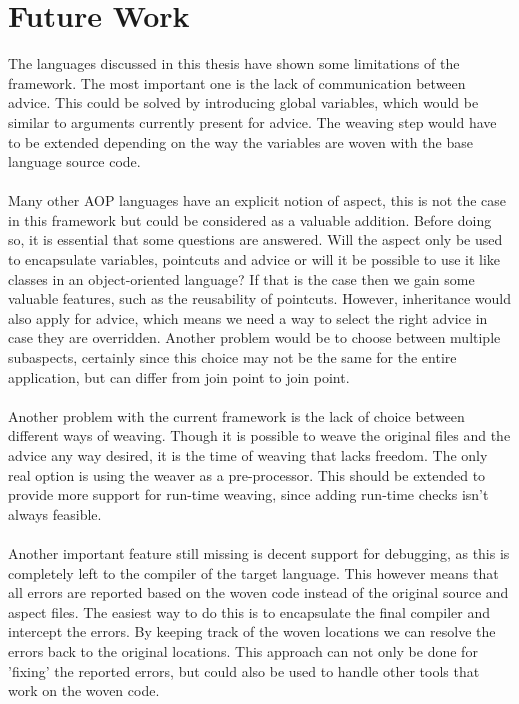 \documentclass[a4paper]{report}
\begin{document}
\chapter{Future Work}
\label{chap:FutureWork}
The languages discussed in this thesis have shown some limitations of the framework. The most important one is the lack of communication between advice. This could be solved by introducing global variables, which would be similar to arguments currently present for advice. The weaving step would have to be extended depending on the way the variables are woven with the base language source code.\\
\\
Many other AOP languages have an explicit notion of aspect, this is not the case in this framework but could be considered as a valuable addition. Before doing so, it is essential that some questions are answered. Will the aspect only be used to encapsulate variables, pointcuts and advice or will it be possible to use it like classes in an object-oriented language? If that is the case then we gain some valuable features, such as the reusability of pointcuts. However, inheritance would also apply for advice, which means we need a way to select the right advice in case they are overridden. Another problem would be to choose between multiple subaspects, certainly since this choice may not be the same for the entire application, but can differ from join point to join point.\\
\\
Another problem with the current framework is the lack of choice between different ways of weaving. Though it is possible to weave the original files and the advice any way desired, it is the time of weaving that lacks freedom. The only real option is using the weaver as a pre-processor. This should be extended to provide more support for run-time weaving, since adding run-time checks isn't always feasible.\\
\\
Another important feature still missing is decent support for debugging, as this is completely left to the compiler of the target language. This however means that all errors are reported based on the woven code instead of the original source and aspect files. The easiest way to do this is to encapsulate the final compiler and intercept the errors. By keeping track of the woven locations we can resolve the errors back to the original locations. This approach can not only be done for 'fixing' the reported errors, but could also be used to handle other tools that work on the woven code.\\
\end{document}
